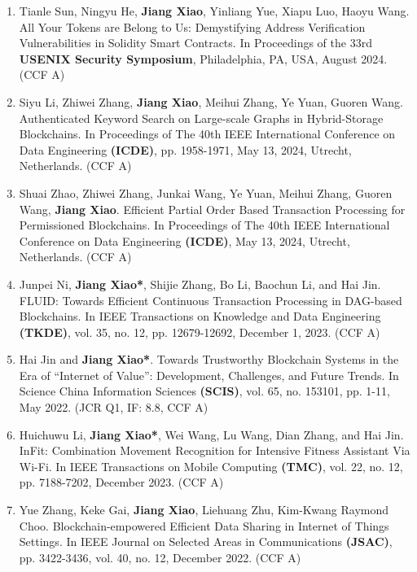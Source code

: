 \begin{enumerate}[itemsep=0pt, topsep=0pt, parsep=0pt]
    \item Tianle Sun, Ningyu He, \textbf{Jiang Xiao}, Yinliang Yue, Xiapu Luo, Haoyu Wang. All Your Tokens are Belong to Us: Demystifying Address Verification Vulnerabilities in Solidity Smart Contracts. In Proceedings of the 33rd \textbf{USENIX Security Symposium}, Philadelphia, PA, USA, August 2024. (CCF A)
    \item Siyu Li, Zhiwei Zhang, \textbf{Jiang Xiao}, Meihui Zhang, Ye Yuan, Guoren Wang. Authenticated Keyword Search on Large-scale Graphs in Hybrid-Storage Blockchains. In Proceedings of The 40th IEEE International Conference on Data Engineering \textbf{(ICDE)}, pp. 1958-1971, May 13, 2024, Utrecht, Netherlands. (CCF A)

    \item Shuai Zhao, Zhiwei Zhang, Junkai Wang, Ye Yuan, Meihui Zhang, Guoren Wang, \textbf{Jiang Xiao}. Efficient Partial Order Based Transaction Processing for Permissioned Blockchains. In Proceedings of The 40th IEEE International Conference on Data Engineering \textbf{(ICDE)}, May 13, 2024, Utrecht, Netherlands. (CCF A)
    \item Junpei Ni, \textbf{Jiang Xiao*}, Shijie Zhang, Bo Li, Baochun Li, and Hai Jin. FLUID: Towards Efficient Continuous Transaction Processing in DAG-based Blockchains. In IEEE Transactions on Knowledge and Data Engineering \textbf{(TKDE)}, vol. 35, no. 12, pp. 12679-12692, December 1, 2023. (CCF A)

    \item Hai Jin and \textbf{Jiang Xiao*}. Towards Trustworthy Blockchain Systems in the Era of ``Internet of Value'': Development, Challenges, and Future Trends. In Science China Information Sciences \textbf{(SCIS)}, vol. 65, no. 153101, pp. 1-11, May 2022. (JCR Q1, IF: 8.8, CCF A)
    \item Huichuwu Li, \textbf{Jiang Xiao*}, Wei Wang, Lu Wang, Dian Zhang, and Hai Jin. InFit: Combination Movement Recognition for Intensive Fitness Assistant Via Wi-Fi. In IEEE Transactions on Mobile Computing \textbf{(TMC)}, vol. 22, no. 12, pp. 7188-7202, December 2023. (CCF A)

    \item Yue Zhang, Keke Gai, \textbf{Jiang Xiao}, Liehuang Zhu, Kim-Kwang Raymond Choo. Blockchain-empowered Efficient Data Sharing in Internet of Things Settings. In IEEE Journal on Selected Areas in Communications \textbf{(JSAC)}, pp. 3422-3436, vol. 40, no. 12, December 2022. (CCF A)


\end{enumerate}
